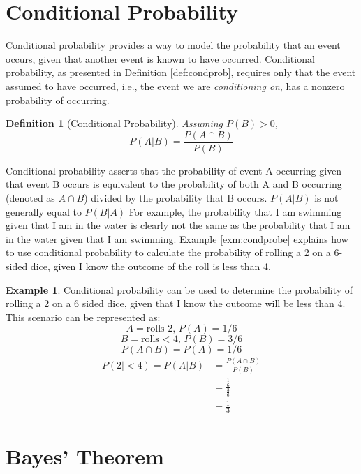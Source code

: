 \documentclass[
  12pt,
]{book}
\theoremstyle{definition}
\newtheorem{definition}{Definition}[chapter]
\theoremstyle{definition}
\newtheorem{example}{Example}[chapter]
\theoremstyle{definition}
\theoremstyle{remark}
\begin{document}
\hypertarget{conditional-probability}{%
\section{Conditional Probability}\label{conditional-probability}}

Conditional probability provides a way to model the probability that an event occurs, given that another event is known to have occurred.
Conditional probability, as presented in Definition \ref{def:condprob}, requires only that the event assumed to have occurred, i.e., the event we are \emph{conditioning on}, has a nonzero probability of occurring.

\begin{definition}[Conditional Probability]
\protect\hypertarget{def:condprob}{}{\label{def:condprob} {} }\emph{Assuming \(P(B)>0\),}
\[P(A|B)=\frac{P(A \cap B)}{P(B)}\]
\end{definition}

Conditional probability asserts that the probability of event A occurring given that event B occurs is equivalent to the probability of both A and B occurring (denoted as \(A \cap B\)) divided by the probability that B occurs. \(P(A|B)\) is not generally equal to \(P(B|A)\)
For example, the probability that I am swimming given that I am in the water is clearly not the same as the probability that I am in the water given that I am swimming.
Example \ref{exm:condprobe} explains how to use conditional probability to calculate the probability of rolling a 2 on a 6-sided dice, given I know the outcome of the roll is less than 4.

\begin{example}
\protect\hypertarget{exm:condprobe}{}{\label{exm:condprobe} }Conditional probability can be used to determine the probability of rolling a 2 on a 6 sided dice, given that I know the outcome will be less than 4. This scenario can be represented as:
\[A = \textrm{rolls 2, } P(A) = 1/6\]
\[B = \textrm{rolls < 4, } P(B) = 3/6\]
\[P(A \cap B) = P(A) = 1/6\]
\[\begin{split}
P(2|<4) = P(A|B) & = \frac{P(A \cap B)}{P(B)} \\
  & = \frac{\frac{1}{6}}{\frac{3}{6}} \\
  & = \frac{1}{3}
\end{split}\]
\end{example}

\hypertarget{bayes-theorem}{%
\section{Bayes' Theorem}\label{bayes-theorem}}
\end{document}
